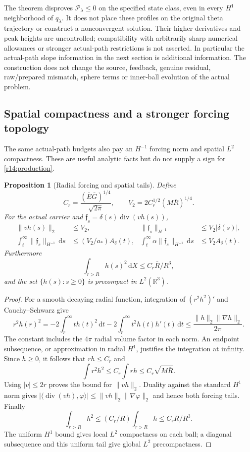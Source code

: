 \documentclass[11pt]{article}
\numberwithin{equation}{section}
\newtheorem{proposition}[theorem]{Proposition}
\newcommand{\dd}{\,\mathrm d}
\newcommand{\R}{\mathbb R}
\begin{document}
The theorem disproves $\mathcal P_\lambda\le0$ on the specified
state class, even in every $H^1$ neighborhood of $q_\lambda$.
It does not place these profiles on the original theta trajectory or
construct a nonconvergent solution. Their higher derivatives and peak
heights are uncontrolled; compatibility with arbitrarily sharp numerical
allowances or stronger actual-path restrictions is not asserted. In
particular the actual-path slope information in the next section is
additional information. The construction does not change the source,
feedback, genuine residual, raw/prepared mismatch, sphere terms or
inner-ball evolution of the actual problem.

\subsection{Spatial compactness and a stronger forcing topology}

The same actual-path budgets also pay an $H^{-1}$ forcing norm and
spatial $L^2$ compactness. These are useful analytic facts but do not
supply a sign for \eqref{r14:production}.

\begin{proposition}[Radial forcing and spatial tails]
\label{r14:topology}
Define
\[
 C_r=\frac{(\bar E\bar G)^{1/4}}{\sqrt{2\pi}},\qquad
 V_2=2C_r^{1/2}(M\bar R)^{1/4}.
\]
For the actual carrier and
$\mathfrak f_s=\delta(s)\operatorname{div}(vh(s))$,
\begin{align}
 \|vh(s)\|_2&\le V_2,&
 \|\mathfrak f_s\|_{H^{-1}}&\le V_2|\delta(s)|,
 \label{r14:hminusone}\\
 \int_t^\infty\|\mathfrak f_s\|_{H^{-1}}\dd s
 &\le(V_2/a_*)A_\delta(t),&
 \int_t^\infty\alpha\|\mathfrak f_s\|_{H^{-1}}\dd s
 &\le V_2A_\delta(t).\nonumber
\end{align}
Furthermore
\begin{equation}\label{r14:spatialtail}
 \int_{r>R}h(s)^2\dd X\le C_r\bar R/R^3,
\end{equation}
and the set $\{h(s):s\ge0\}$ is precompact in $L^2(\R^3)$.
\end{proposition}
\begin{proof}
For a smooth decaying radial function, integration of $(r^2h^2)'$
and Cauchy--Schwarz give
\[
 r^2h(r)^2=-2\int_r^\infty th(t)^2\dd t
           -2\int_r^\infty t^2h(t)h'(t)\dd t
 \le\frac{\|h\|_2\|\nabla h\|_2}{2\pi}.
\]
The constant includes the $4\pi$ radial volume factor in each norm.
An endpoint subsequence, or approximation in radial $H^1$, justifies
the integration at infinity. Since $h\ge0$, it follows that $rh\le C_r$
and
\[
 \int r^2h^2\le C_r\int rh\le C_r\sqrt{M\bar R}.
\]
Using $|v|\le2r$ proves the bound for $\|vh\|_2$. Duality against the
standard $H^1$ norm gives
$|\langle\operatorname{div}(vh),\varphi\rangle|
 \le\|vh\|_2\|\nabla\varphi\|_2$ and hence both forcing tails.
Finally
\[
 \int_{r>R}h^2\le(C_r/R)\int_{r>R}h
              \le C_r\bar R/R^3.
\]
The uniform $H^1$ bound gives local $L^2$ compactness on each ball;
a diagonal subsequence and this uniform tail give global $L^2$
precompactness.
\end{proof}
\end{document}
